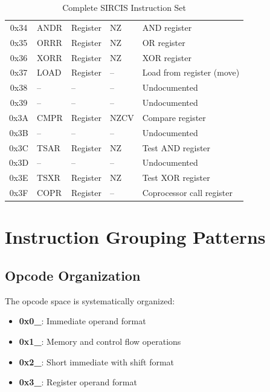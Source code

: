 \begin{table}[H]
\begin{tabular}{clllp{4cm}}
		0x34            & ANDR              & Register        & NZ             & AND register                  \\
		0x35            & ORRR              & Register        & NZ             & OR register                   \\
		0x36            & XORR              & Register        & NZ             & XOR register                  \\
		0x37            & LOAD              & Register        & --             & Load from register (move)     \\
		0x38            & --                & --              & --             & Undocumented                  \\
		0x39            & --                & --              & --             & Undocumented                  \\
		0x3A            & CMPR              & Register        & NZCV           & Compare register              \\
		0x3B            & --                & --              & --             & Undocumented                  \\
		0x3C            & TSAR              & Register        & NZ             & Test AND register             \\
		0x3D            & --                & --              & --             & Undocumented                  \\
		0x3E            & TSXR              & Register        & NZ             & Test XOR register             \\
		0x3F            & COPR              & Register        & --             & Coprocessor call register     \\
		\bottomrule
	\end{tabular}
	\caption{Complete SIRCIS Instruction Set}
	\label{tab:complete-instruction-set}
\end{table}

\section{Instruction Grouping Patterns}

\subsection{Opcode Organization}

The opcode space is systematically organized:

\begin{itemize}
	\item \textbf{0x0\_}: Immediate operand format
	\item \textbf{0x1\_}: Memory and control flow operations
	\item \textbf{0x2\_}: Short immediate with shift format
	\item \textbf{0x3\_}: Register operand format
\end{itemize}

